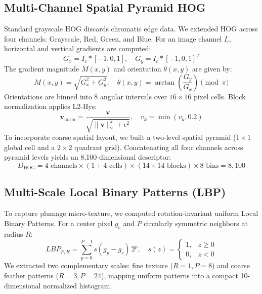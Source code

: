 \documentclass[conference]{IEEEtran}
\begin{document}
\subsection{Multi-Channel Spatial Pyramid HOG}
Standard grayscale HOG discards chromatic edge data. We extended HOG across four channels: Grayscale, Red, Green, and Blue. For an image channel $I_c$, horizontal and vertical gradients are computed:
\begin{equation}
G_x = I_c * [-1, 0, 1], \quad G_y = I_c * [-1, 0, 1]^T
\end{equation}
The gradient magnitude $M(x,y)$ and orientation $\theta(x,y)$ are given by:
\begin{equation}
M(x,y) = \sqrt{G_x^2 + G_y^2}, \quad \theta(x,y) = \arctan\left(\frac{G_y}{G_x}\right) \pmod{\pi}
\end{equation}
Orientations are binned into 8 angular intervals over $16 \times 16$ pixel cells. Block normalization applies L2-Hys:
\begin{equation}
\mathbf{v}_{\text{norm}} = \frac{\mathbf{v}}{\sqrt{\|\mathbf{v}\|_2^2 + \epsilon^2}}, \quad v_k = \min(v_k, 0.2)
\end{equation}
To incorporate coarse spatial layout, we built a two-level spatial pyramid ($1 \times 1$ global cell and a $2 \times 2$ quadrant grid). Concatenating all four channels across pyramid levels yields an 8,100-dimensional descriptor:
\begin{equation}
D_{\text{HOG}} = 4 \text{ channels} \times (1 + 4 \text{ cells}) \times (14 \times 14 \text{ blocks}) \times 8 \text{ bins} = 8,100
\end{equation}

\subsection{Multi-Scale Local Binary Patterns (LBP)}
To capture plumage micro-texture, we computed rotation-invariant uniform Local Binary Patterns. For a center pixel $g_c$ and $P$ circularly symmetric neighbors at radius $R$:
\begin{equation}
LBP_{P,R} = \sum_{p=0}^{P-1} s(g_p - g_c) \, 2^p, \quad s(z) = \begin{cases} 1, & z \ge 0 \\ 0, & z < 0 \end{cases}
\end{equation}
We extracted two complementary scales: fine texture ($R=1, P=8$) and coarse feather patterns ($R=3, P=24$), mapping uniform patterns into a compact 10-dimensional normalized histogram.
\end{document}
